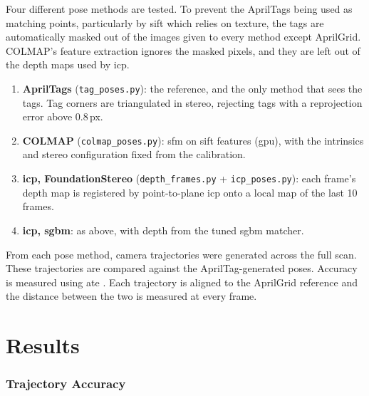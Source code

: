 \label{subsec:ch5.methods_tested}
Four different pose methods are tested. To prevent the AprilTags being used as matching points, particularly by \gls{sift}
which relies on texture, the tags are automatically masked out of the images given to every method except
AprilGrid. COLMAP’s feature extraction ignores the masked pixels, and they are left out of the depth maps used by \gls{icp}.


\label{subsec:ch5.methods_tested_error}
\begin{enumerate}
    \item \textbf{AprilTags} (\texttt{tag\_poses.py}): the reference, and the only method that sees the tags.
    Tag corners are triangulated in stereo, rejecting tags with a reprojection error above 0.8\,px.
    \item \textbf{COLMAP} (\texttt{colmap\_poses.py}): \gls{sfm} on \gls{sift} features (\gls{gpu}), with the intrinsics and stereo
    configuration fixed from the calibration.
    \item \textbf{\gls{icp}, FoundationStereo} (\texttt{depth\_frames.py} + \texttt{icp\_poses.py}): each frame's depth map
    is registered by point-to-plane \gls{icp} onto a local map of the last 10 frames.
    \item \textbf{\gls{icp}, \gls{sgbm}}: as above, with depth from the tuned \gls{sgbm} matcher.
\end{enumerate}



\label{subsec:ch5.evaluating_pose_estimations}
From each pose method, camera trajectories were generated across the full scan. These trajectories are compared against the AprilTag-generated poses. 
Accuracy is measured using \gls{ate} \cite{sturmBenchmarkEvaluationRGBD2012}. Each trajectory is aligned to the AprilGrid reference and the
distance between the two is measured at every frame.

\section{Results}
\label{subsec:ch5.pose_results}
\subsubsection{Trajectory Accuracy}

